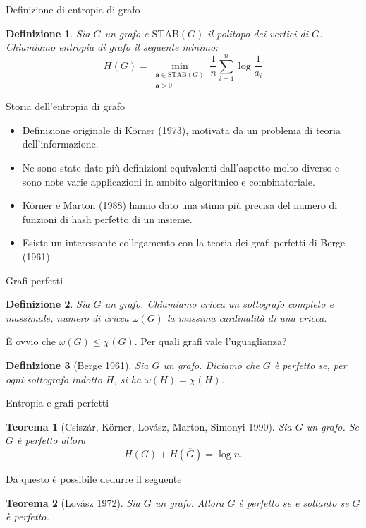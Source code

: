 \documentclass[10pt]{beamer}
\newtheorem{teorema}{Teorema}
\newtheorem{definizione}{Definizione}
\begin{document}
\begin{frame}
  {Definizione di entropia di grafo}
  \begin{definizione}
    Sia \(G\) un grafo e \(\text{STAB}(G)\) il politopo dei vertici di 
    \(G\). Chiamiamo \emph{entropia di grafo} il seguente minimo:
    \[
      H(G)=\min_{\substack{\mathbf{a}\in\text{STAB}(G) \\ \mathbf{a}>0}}{\frac{1}{n}\sum_{i=1}^n{\log{\frac{1}{a_i}}}}
    \]
  \end{definizione}
\end{frame}

\begin{frame}
  {Storia dell'entropia di grafo}
  \begin{itemize}
  \item Definizione originale di K\"orner (1973), motivata da un
    problema di teoria dell'informazione.
  \item Ne sono state date più definizioni equivalenti dall'aspetto
    molto diverso e sono note varie applicazioni in ambito algoritmico
    e combinatoriale.
  \item K\"orner e Marton (1988) hanno dato una stima pi\`u precisa
    del numero di funzioni di hash perfetto di un insieme.
  \item Esiste un interessante collegamento con la teoria dei grafi
    perfetti di Berge (1961).
  \end{itemize}
\end{frame}

\begin{frame}
  {Grafi perfetti}
  \begin{definizione}
    Sia \(G\) un grafo. Chiamiamo \emph{cricca} un sottografo completo e massimale,
    \emph{numero di cricca} \(\omega(G)\) la massima cardinalit\`a di una cricca.
  \end{definizione}
  \vspace{5mm}
  \`E ovvio che \(\omega(G)\le\chi(G)\). Per quali grafi vale l'uguaglianza?
  \vspace{5mm}
  \begin{definizione}[Berge 1961]
    Sia \(G\) un grafo. Diciamo che \(G\) \`e perfetto se, per ogni sottografo indotto
    \(H\), si ha \(\omega(H)=\chi(H)\).
  \end{definizione}
\end{frame}

\begin{frame}
  {Entropia e grafi perfetti}
  \begin{teorema}[Csiszár, K\"orner, Lovász, Marton, Simonyi 1990]
    Sia \(G\) un grafo. Se \(G\) \`e perfetto allora
    \[
      H(G) + H(\overline{G}) = \log{n}\text{.}
    \]
  \end{teorema}
  \vspace{3mm}
  Da questo \`e possibile dedurre il seguente
  \vspace{3mm}
  \begin{teorema}[Lov\'asz 1972]
    Sia \(G\) un grafo. Allora \(G\) \`e perfetto se e soltanto se \(\overline{G}\) \`e perfetto.
  \end{teorema}
\end{frame}
\end{document}
